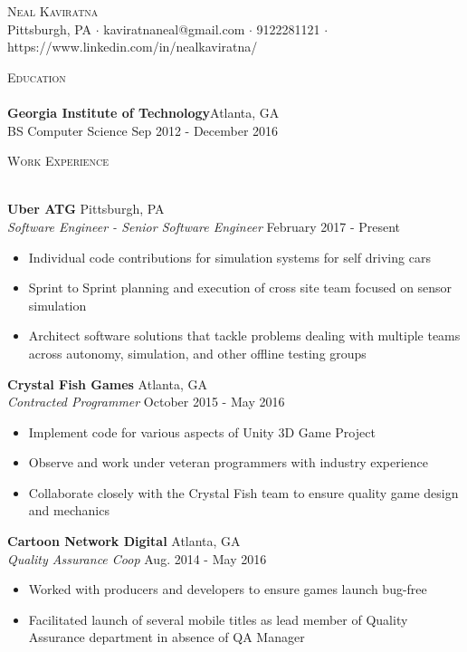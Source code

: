 \documentclass[a4paper]{article}
\newcommand{\lineunder} {
    \vspace*{-8pt} \\
    \hspace*{-18pt} \hrulefill \\
}
\newcommand{\header} [1] {
    {\hspace*{-18pt}\vspace*{6pt} \textsc{#1}}
    \vspace*{-6pt} \lineunder
}
\begin{document}
\vspace*{-40pt}

    

\vspace*{-10pt}
\begin{center}
	{\Huge \scshape {Neal Kaviratna}}\\
	Pittsburgh, PA $\cdot$ kaviratnaneal@gmail.com $\cdot$ 9122281121 $\cdot$ https://www.linkedin.com/in/nealkaviratna/\\
\end{center}

\header{Education}
\textbf{Georgia Institute of Technology}\hfill Atlanta, GA\\
BS Computer Science \hfill Sep 2012 - December 2016\\
\vspace{2mm}

\header{Work Experience}
\vspace{1mm}

\textbf{Uber ATG} \hfill Pittsburgh, PA\\
\textit{Software Engineer - Senior Software Engineer} \hfill February 2017 - Present\\
\vspace{-1mm}
\begin{itemize} \itemsep 1pt
	\item Individual code contributions for simulation systems for self driving cars
	\item Sprint to Sprint planning and execution of cross site team focused on sensor simulation
	\item Architect software solutions that tackle problems dealing with multiple teams across autonomy, simulation, and other offline testing groups
\end{itemize}
\textbf{Crystal Fish Games} \hfill Atlanta, GA\\
\textit{Contracted Programmer} \hfill October 2015 - May 2016\\
\vspace{-1mm}
\begin{itemize} \itemsep 1pt
	\item Implement code for various aspects of Unity 3D Game Project
	\item Observe and work under veteran programmers with industry experience
	\item Collaborate closely with the Crystal Fish team to ensure quality game design and mechanics
\end{itemize}
\textbf{Cartoon Network Digital} \hfill Atlanta, GA\\
\textit{Quality Assurance Coop} \hfill Aug. 2014 - May 2016\\
\vspace{-1mm}
\begin{itemize} \itemsep 1pt
	\item Worked with producers and developers to ensure games launch bug-free
	\item Facilitated launch of several mobile titles as lead member of Quality Assurance department in absence of QA Manager
\end{itemize}
\end{document}
